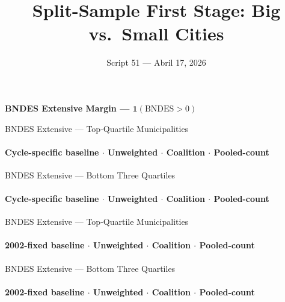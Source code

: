 \documentclass[aspectratio=169,10pt]{beamer}
\title{Split-Sample First Stage: Big vs.\ Small Cities}
\subtitle{Script 51 --- Abril 17, 2026}
\author{}
\date{}
\newcommand{\tabledir}{../tables/firm}
\begin{document}
\begin{frame}
\titlepage
\end{frame}


\begin{frame}[plain]
\begin{center}
{\Large\textbf{BNDES Extensive Margin --- $\mathbf{1}(\text{BNDES}>0)$}}
\end{center}
\end{frame}


\begin{frame}[t,shrink=5]{BNDES Extensive --- Top-Quartile Municipalities}
\framesubtitle{Cycle-specific baseline $\cdot$ Unweighted $\cdot$ Coalition $\cdot$ Pooled-count}
\begin{center}\footnotesize

\end{center}
\end{frame}

\begin{frame}[t,shrink=5]{BNDES Extensive --- Bottom Three Quartiles}
\framesubtitle{Cycle-specific baseline $\cdot$ Unweighted $\cdot$ Coalition $\cdot$ Pooled-count}
\begin{center}\footnotesize

\end{center}
\end{frame}


\begin{frame}[t,shrink=5]{BNDES Extensive --- Top-Quartile Municipalities}
\framesubtitle{2002-fixed baseline $\cdot$ Unweighted $\cdot$ Coalition $\cdot$ Pooled-count}
\begin{center}\footnotesize

\end{center}
\end{frame}

\begin{frame}[t,shrink=5]{BNDES Extensive --- Bottom Three Quartiles}
\framesubtitle{2002-fixed baseline $\cdot$ Unweighted $\cdot$ Coalition $\cdot$ Pooled-count}
\begin{center}\footnotesize

\end{center}
\end{frame}
\end{document}
